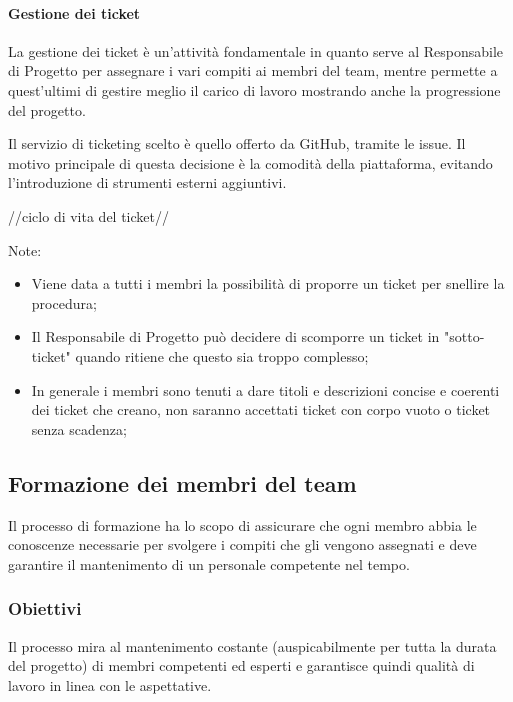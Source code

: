 \paragraph{Gestione dei ticket}
La gestione dei ticket è un'attività fondamentale in quanto serve al Responsabile di Progetto per assegnare i vari compiti ai membri del team, mentre permette a quest'ultimi di gestire meglio il carico di lavoro mostrando anche la progressione del progetto.

Il servizio di ticketing scelto è quello offerto da GitHub, tramite le issue. Il motivo principale di questa decisione è la comodità della piattaforma, evitando l'introduzione di strumenti esterni aggiuntivi.

//ciclo di vita del ticket//

Note:
\begin{itemize}
\item Viene data a tutti i membri la possibilità di proporre un ticket per snellire la procedura;
\item Il Responsabile di Progetto può decidere di scomporre un ticket in "sotto-ticket" quando ritiene che questo sia troppo complesso;
\item In generale i membri sono tenuti a dare titoli e descrizioni concise e coerenti dei ticket che creano, non saranno accettati ticket con corpo vuoto o ticket senza scadenza;
\end{itemize}

\subsection{Formazione dei membri del team}
Il processo di formazione ha lo scopo di assicurare che ogni membro abbia le conoscenze necessarie per svolgere i compiti che gli vengono assegnati e deve garantire il mantenimento di un personale competente nel tempo.

\subsubsection{Obiettivi}
Il processo mira al mantenimento costante (auspicabilmente per tutta la durata del progetto) di membri competenti ed esperti e garantisce quindi qualità di lavoro in linea con le aspettative.

